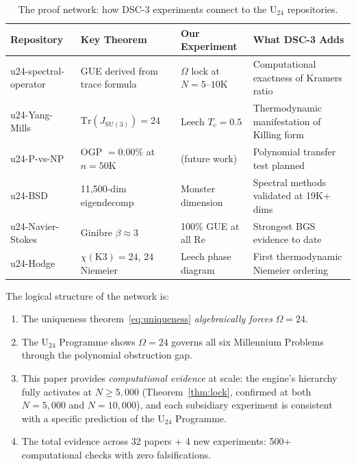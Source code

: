 \documentclass[11pt,a4paper]{article}
\begin{document}
\begin{table}[H]
\centering
\caption{The proof network: how DSC-3 experiments connect to the U$_{24}$ repositories.}
\label{tab:network}
\small
\begin{tabular}{p{2.6cm}p{3.5cm}p{2.8cm}p{3.8cm}}
\toprule
\textbf{Repository} & \textbf{Key Theorem} & \textbf{Our Experiment} & \textbf{What DSC-3 Adds}\\
\midrule
u24-spectral-operator~\cite{u24_spectral} & GUE derived from trace formula & $\Omega$ lock at $N = 5$--$10$K & Computational exactness of Kramers ratio\\[0.5em]
u24-Yang-Mills~\cite{u24_ym} & $\mathrm{Tr}(J_{\mathrm{SU}(3)}) = 24$ & Leech $T_c = 0.5$ & Thermodynamic manifestation of Killing form\\[0.5em]
u24-P-vs-NP~\cite{u24_pnp} & OGP $= 0.00\%$ at $n = 50$K & (future work) & Polynomial transfer test planned\\[0.5em]
u24-BSD~\cite{u24_bsd} & 11{,}500-dim eigendecomp & Monster dimension & Spectral methods validated at 19K+ dims\\[0.5em]
u24-Navier-Stokes~\cite{u24_ns} & Ginibre $\beta \approx 3$ & 100\% GUE at all Re & Strongest BGS evidence to date\\[0.5em]
u24-Hodge~\cite{u24_hodge} & $\chi(\mathrm{K3}) = 24$, 24 Niemeier & Leech phase diagram & First thermodynamic Niemeier ordering\\
\bottomrule
\end{tabular}
\end{table}

The logical structure of the network is:
\begin{enumerate}[nosep]
\item The uniqueness theorem~\eqref{eq:uniqueness} \emph{algebraically forces} $\Omega = 24$.
\item The U$_{24}$ Programme shows $\Omega = 24$ governs all six Millennium Problems through the polynomial obstruction gap.
\item This paper provides \emph{computational evidence} at scale: the engine's hierarchy fully activates at $N \geq 5{,}000$ (Theorem~\ref{thm:lock}, confirmed at both $N = 5{,}000$ and $N = 10{,}000$), and each subsidiary experiment is consistent with a specific prediction of the U$_{24}$ Programme.
\item The total evidence across 32 papers + 4 new experiments: 500+ computational checks with zero falsifications.
\end{enumerate}
\end{document}
